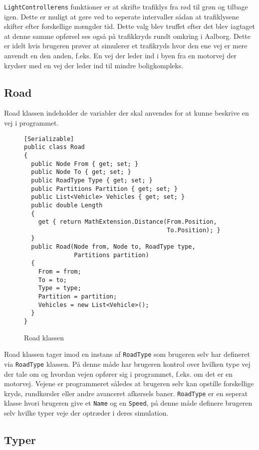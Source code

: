 \texttt{LightControllerens} funktioner er at skrifte trafiklys fra rød til grøn og tilbage igen. Dette er muligt at gøre ved to seperate intervaller sådan at trafiklysene skifter efter forskellige mængder tid. Dette valg blev truffet efter det blev iagtaget at denne samme opførsel ses også på trafikkryds rundt omkring i Aalborg. Dette er idelt hvis brugeren prøver at simulerer et trafikryds hvor den ene vej er mere anvendt en den anden, f.eks. En vej der leder ind i byen fra en motorvej der krydser med en vej der leder ind til mindre boligkompleks.

\subsection{Road}
Road klassen indeholder de variabler der skal anvendes for at kunne beskrive en vej i programmet.

\begin{figure}[H]
\begin{lstlisting}
[Serializable]
public class Road
{
  public Node From { get; set; }
  public Node To { get; set; }
  public RoadType Type { get; set; }
  public Partitions Partition { get; set; }
  public List<Vehicle> Vehicles { get; set; }
  public double Length
  {
    get { return MathExtension.Distance(From.Position, 
                                        To.Position); }
  }   
  public Road(Node from, Node to, RoadType type, 
              Partitions partition)
  {
    From = from;
    To = to;
    Type = type;
    Partition = partition;
    Vehicles = new List<Vehicle>();
  }
}
\end{lstlisting}
\caption{Road klassen}\label{RoadKlassen}
\end{figure}

Road klassen tager imod en instans af \texttt{RoadType} som brugeren selv har defineret via \texttt{RoadType} klassen. På denne måde har brugeren kontrol over hvilken type vej der tale om og hvordan vejen opfører sig i programmet, f.eks. om det er en motorvej. Vejene er programmeret således at brugeren selv kan opstille forskellige kryds, rundkørsler eller andre avanceret afkørsels baner. \texttt{RoadType} er en seperat klasse hvori brugeren give et \texttt{Name} og en \texttt{Speed}, på denne måde definere brugeren selv hvilke typer veje der optræder i deres simulation.

\subsection{Typer}